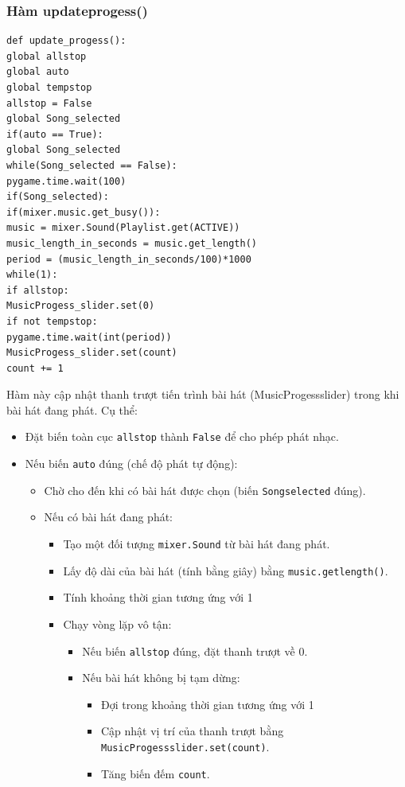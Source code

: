 \documentclass[a4paper]{article}
\begin{document}
\begin{enumerate}
\subsubsection{Hàm updateprogess()}
\begin{mdframed}[hidealllines=true,backgroundcolor=magenta!10]
\begin{lstlisting}
def update_progess():
global allstop
global auto
global tempstop
allstop = False
global Song_selected
if(auto == True):
global Song_selected
while(Song_selected == False):
pygame.time.wait(100)
if(Song_selected):
if(mixer.music.get_busy()):
music = mixer.Sound(Playlist.get(ACTIVE))
music_length_in_seconds = music.get_length()
period = (music_length_in_seconds/100)*1000
while(1):
if allstop:
MusicProgess_slider.set(0)
if not tempstop:
pygame.time.wait(int(period))
MusicProgess_slider.set(count)
count += 1
\end{lstlisting}
\end{mdframed}
Hàm này cập nhật thanh trượt tiến trình bài hát (MusicProgessslider) trong khi bài hát đang phát. Cụ thể:
\begin{itemize}
\item Đặt biến toàn cục \texttt{allstop} thành \texttt{False} để cho phép phát nhạc.
\item Nếu biến \texttt{auto} đúng (chế độ phát tự động):
\begin{itemize}
\item Chờ cho đến khi có bài hát được chọn (biến \texttt{Songselected} đúng).
\item Nếu có bài hát đang phát:
\begin{itemize}
\item Tạo một đối tượng \texttt{mixer.Sound} từ bài hát đang phát.
\item Lấy độ dài của bài hát (tính bằng giây) bằng \texttt{music.getlength()}.
\item Tính khoảng thời gian tương ứng với 1%
\item Chạy vòng lặp vô tận:
\begin{itemize}
\item Nếu biến \texttt{allstop} đúng, đặt thanh trượt về 0.
\item Nếu bài hát không bị tạm dừng:
\begin{itemize}
\item Đợi trong khoảng thời gian tương ứng với 1%
\item Cập nhật vị trí của thanh trượt bằng \texttt{MusicProgessslider.set(count)}.
\item Tăng biến đếm \texttt{count}.
\end{itemize}
\end{itemize}
\end{itemize}
\end{itemize}
\end{itemize}


\end{enumerate}
\end{document}
